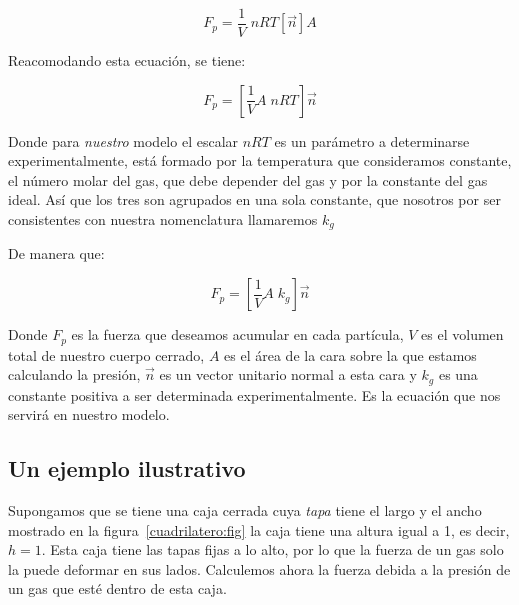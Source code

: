 $$ F_p = \frac{1}{V} \; nRT \left[ \vec{n} \right] A $$

Reacomodando esta ecuación, se tiene:

$$ F_p = \left[ \frac{1}{V}A \; nRT \right] \vec{n} $$

Donde para \emph{nuestro} modelo el escalar $nRT$ es un parámetro a determinarse experimentalmente, está formado por la temperatura que consideramos constante, el número molar del gas, que debe depender del gas y por la constante del gas ideal. Así que los tres son agrupados en una sola constante, que nosotros por ser consistentes con nuestra nomenclatura llamaremos $k_g$

De manera que: 

\begin{equation}
\label{fuerzaGas}
F_p = \left[ \frac{1}{V}A \; k_g \right] \vec{n}
\end{equation}

Donde $F_p$ es la fuerza que deseamos acumular en cada partícula, $V$ es el volumen total de nuestro cuerpo cerrado, $A$ es el área de la cara sobre la que estamos calculando la presión, $\vec{n}$ es un vector unitario normal a esta cara y $k_g$ es una constante positiva a ser determinada experimentalmente. Es la ecuación que nos servirá en nuestro modelo.

\subsection{Un ejemplo ilustrativo}

Supongamos que se tiene una caja cerrada cuya \emph{tapa} tiene el largo y el ancho mostrado en la figura~\ref{cuadrilatero:fig} la caja tiene una altura igual a 1, es decir, $h=1$. Esta caja tiene las tapas fijas a lo alto, por lo que la fuerza de un gas solo la puede deformar en sus lados. Calculemos ahora la fuerza debida a la presión de un gas que esté dentro de esta caja.

